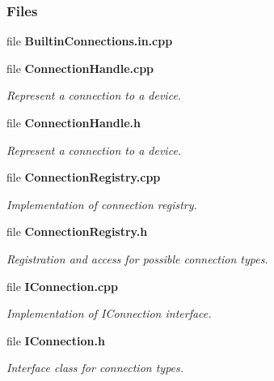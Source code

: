 \subsubsection*{Files}
\begin{DoxyCompactItemize}
\item 
file {\bf Builtin\+Connections.\+in.\+cpp}
\item 
file {\bf Connection\+Handle.\+cpp}
\begin{DoxyCompactList}\small\item\em Represent a connection to a device. \end{DoxyCompactList}\item 
file {\bf Connection\+Handle.\+h}
\begin{DoxyCompactList}\small\item\em Represent a connection to a device. \end{DoxyCompactList}\item 
file {\bf Connection\+Registry.\+cpp}
\begin{DoxyCompactList}\small\item\em Implementation of connection registry. \end{DoxyCompactList}\item 
file {\bf Connection\+Registry.\+h}
\begin{DoxyCompactList}\small\item\em Registration and access for possible connection types. \end{DoxyCompactList}\item 
file {\bf I\+Connection.\+cpp}
\begin{DoxyCompactList}\small\item\em Implementation of I\+Connection interface. \end{DoxyCompactList}\item 
file {\bf I\+Connection.\+h}
\begin{DoxyCompactList}\small\item\em Interface class for connection types. \end{DoxyCompactList}\end{DoxyCompactItemize}
